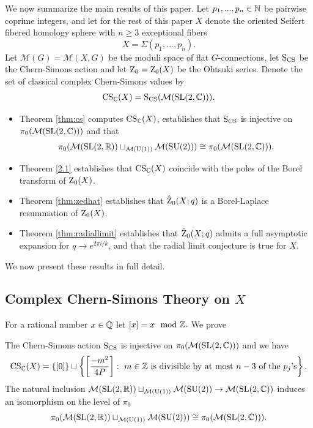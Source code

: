We now summarize the main results of this paper. Let $p_1,...,p_n \in \mathbb{N}$  be pairwise coprime integers, and let for the rest of this paper $X$ denote the oriented Seifert fibered homology sphere with $n\geq 3$ exceptional fibers
 \begin{equation} X= \Sigma(p_1,...,p_n).
 \end{equation} Let $\mathcal{M}(G)=\mathcal{M}(X,G)$ be the moduli space of flat $G$-connections, let $\operatorname{S_{CS}}$ be the Chern-Simons action and let  $\operatorname{Z}_0= \operatorname{Z}_0(X)$ be the Ohtsuki series. Denote the set of classical complex Chern-Simons values by
$$\operatorname{CS}_{\mathbb{C}}(X)=\operatorname{S_{CS}}(\mathcal{M}(\operatorname{SL}(2,\mathbb{C}))).$$ 
  \begin{itemize} 
  	  \item Theorem \ref{thm:cs} computes $\operatorname{CS}_{\mathbb{C}}(X)$, establishes that $\operatorname{S_{CS}}$ is injective on $\pi_0(\mathcal{M}(\operatorname{SL}(2,\mathbb{C})))$ and  that
  	$$ \pi_0(\mathcal{M}(\operatorname{SL}(2,\mathbb{R}))\sqcup_{\mathcal{M}(\text{U}(1))} \mathcal{M}(\operatorname{SU}(2))) \cong \pi_0(\mathcal{M}(\operatorname{SL}(2,\mathbb{C}))).$$
  \item Theorem \ref{2.1} establishes that $\operatorname{CS}_{\mathbb{C}}(X)$  coincide with the poles of the Borel transform of  $\operatorname{Z}_0(X)$. 
  \item Theorem \ref{thm:zedhat} establishes that $\hat{\operatorname{Z}}_0(X;q)$ is a Borel-Laplace resummation of $\operatorname{Z}_0(X)$.
  \item  Theorem \ref{thm:radiallimit} establishes that $\hat{\operatorname{Z}}_0(X;q)$ admits a full asymptotic expansion for $q \rightarrow e^{2\pi i/k}$, and that the radial limit conjecture is true for $X$.

  
  
  \end{itemize}
We now present these results in full detail.


\subsection*{Complex Chern-Simons Theory on $X$}


For a rational number $x \in \mathbb{Q}$ let $[x]= x \mod {\mathbb{Z}}.$ We prove


\begin{theorem} \label{thm:cs}
	The Chern-Simons action $\operatorname{S_{CS}}$  is injective on $\pi_0(\mathcal{M}(\operatorname{SL}(2,\mathbb{C})))$ and we have
	\begin{equation} \operatorname{CS}_{\mathbb{C}}(X)= \{[0]\} \sqcup\left\{ \left[ \frac{-m^2}{4P}\right]  : \text{  $m \in \mathbb{Z}$ is divisible by at most $n-3$ of the $p_j$'s}\right\}.
	\end{equation}
	The natural inclusion $ \mathcal{M}(\operatorname{SL}(2,\mathbb{R}))\sqcup_{\mathcal{M}(\text{U}(1))} \mathcal{M}(\operatorname{SU}(2)) \rightarrow  \mathcal{M}(\operatorname{SL}(2,\mathbb{C}))$
	induces an isomorphism on the level of $\pi_0$
	$$ \pi_0(\mathcal{M}(\operatorname{SL}(2,\mathbb{R}))\sqcup_{\mathcal{M}(\text{U}(1))} \mathcal{M}(\operatorname{SU}(2))) \cong \pi_0(\mathcal{M}(\operatorname{SL}(2,\mathbb{C}))).$$
	\end{theorem} 

